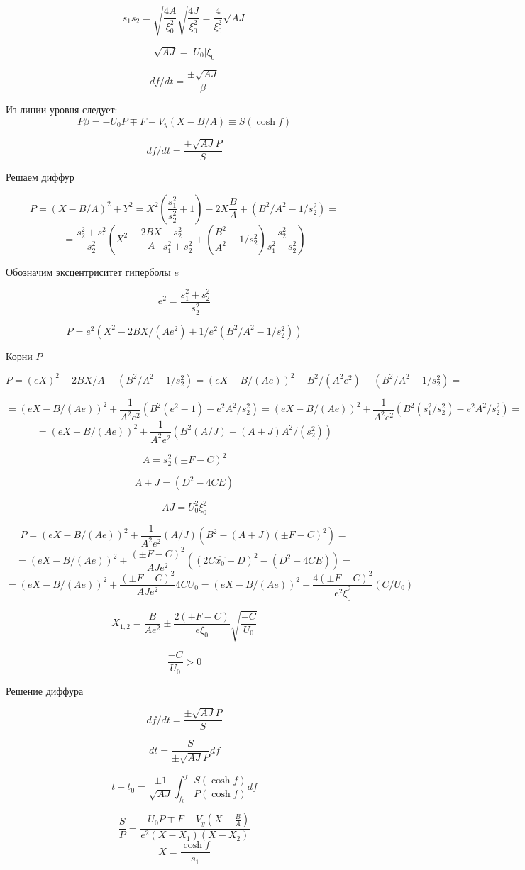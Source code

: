 $$s_1 s_2 = \sqrt{\frac{4A}{\xi_0^2}} \sqrt{\frac{4J}{\xi_0^2}} = \frac{4}{\xi_0^2} \sqrt{AJ}$$

$$\sqrt{AJ} = |U_0| \xi_0$$

$$df/dt = \frac{\pm \sqrt{AJ}}{\beta}$$

Из линии уровня следует:
$$P \beta = - U_0 P \mp F - V_y (X-B/A) \equiv S(\cosh f)$$

$$df/dt = \frac{\pm \sqrt{AJ} P}{S}$$

Решаем диффур

$$P = (X-B/A)^2 +Y^2 = X^2(\frac{s_1^2}{s_2^2}+1) -2X \frac{B}{A} + (B^2/A^2 - 1/s_2^2)=$$
$$=\frac{s_2^2+s_1^2}{s_2^2} \left( X^2 - \frac{2BX}{A} \frac{s_2^2}{s_1^2+s_2^2} + (\frac{B^2}{A^2}-1/s_2^2)\frac{s_2^2}{s_1^2+s_2^2} \right)$$

Обозначим эксцентриситет гиперболы $e$

$$e^2 = \frac{s_1^2+s_2^2}{s_2^2}$$

$$P = e^2 (X^2 - 2BX/(Ae^2) + 1/e^2 (B^2/A^2-1/s_2^2))$$



Корни $P$

$$P = (eX)^2 - 2BX/A + (B^2/A^2-1/s_2^2) = (eX-B/(Ae))^2 - B^2/(A^2e^2) + (B^2/A^2-1/s_2^2)=$$

$$=(eX-B/(Ae))^2 + \frac{1}{A^2e^2}(B^2(e^2-1)-e^2A^2/s_2^2) = (eX-B/(Ae))^2 + \frac{1}{A^2e^2}(B^2(s_1^2/s_2^2)-e^2A^2/s_2^2) = $$
$$= (eX-B/(Ae))^2 + \frac{1}{A^2e^2}(B^2(A/J)-(A+J)A^2/(s_2^2))$$

$$A = s_2^2 (\pm F - C)^2$$

$$A+J = (D^2-4CE)$$

$$AJ = U_0^2 \xi_0^2$$

$$P = (eX-B/(Ae))^2 + \frac{1}{A^2e^2} (A/J) (B^2-(A+J)(\pm F-C)^2)=$$
$$ = (eX-B/(Ae))^2 + \frac{(\pm F- C)^2}{AJ e^2} ((2C \hat{x_0} + D)^2 - (D^2-4CE) ) = $$
$$ = (eX-B/(Ae))^2 + \frac{(\pm F- C)^2}{AJ e^2} 4CU_0 = (eX-B/(Ae))^2 + \frac{4(\pm F- C)^2}{e^2 \xi_0^2} (C/U_0)$$

$$X_{1,2} = \frac{B}{Ae^2} \pm \frac{2(\pm F - C)}{e \xi_0} \sqrt{\frac{-C}{U_0}}$$

$$\frac{-C}{U_0} > 0$$

Решение диффура

$$df/dt = \frac{\pm \sqrt{AJ} P}{S}$$

$$dt = \frac{S}{\pm \sqrt{AJ} P} df $$

$$t - t_0 = \frac{\pm1}{\sqrt{AJ}} \int_{f_0}^f \frac{S(\cosh f)}{P(\cosh f)} df$$

$$\frac SP = \frac{-U_0 P \mp F - V_y (X-\frac{B}{A})}{e^2(X-X_1)(X-X_2)}$$
$$X = \frac{\cosh f}{s_1}$$

